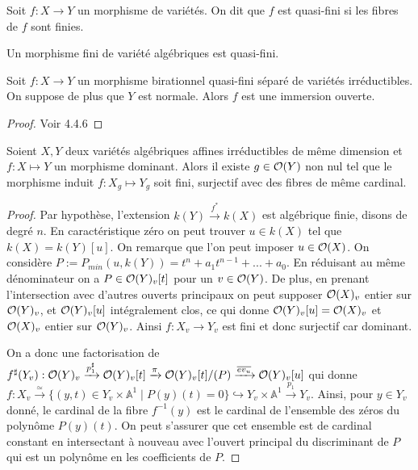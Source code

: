 \begin{defn}
Soit $f:X \rightarrow Y$ un morphisme de variétés. On dit que $f$ est quasi-fini si les fibres de $f$ sont finies.
\end{defn}

\begin{ex}
Un morphisme fini de variété algébriques est quasi-fini.
\end{ex}

\begin{thm}\label{ZMT}
Soit $f:X\rightarrow Y$ un morphisme birationnel quasi-fini séparé de variétés irréductibles. On suppose de plus que $Y$ est normale. Alors $f$ est une immersion ouverte.
\end{thm}
\begin{proof}
Voir \cite{QingLiu} 4.4.6
\end{proof}

\begin{prop}\label{fibersCardinal}
Soient $X,Y$ deux variétés algébriques affines irréductibles de même dimension et $f:X \mapsto Y$ un morphisme dominant. Alors il existe $g\in \mathcal{O}(Y)$ non nul tel que le morphisme induit $f:X_g \mapsto Y_g$ soit fini, surjectif avec des fibres de même cardinal.
\end{prop}
\begin{proof}
Par hypothèse, l'extension $k(Y) \xrightarrow{f^*} k(X)$ est algébrique finie, disons de degré $n$. En caractéristique zéro on peut trouver $u\in k(X)$ tel que $k(X)=k(Y)[u]$. On remarque que l'on peut imposer $u\in \mathcal{O}(X)$. On considère $P:=P_{min}(u, k(Y))=t^n+a_1t^{n-1}+...+a_0$. En réduisant au même dénominateur on a $P\in \mathcal{O}(Y)_v[t]$ pour un $v\in \mathcal{O}(Y)$. De plus, en prenant l'intersection avec d'autres ouverts principaux on peut supposer $\mathcal{O}(X)_v$ entier sur $\mathcal{O}(Y)_v$, et $\mathcal{O}(Y)_v[u]$ intégralement clos, ce qui donne $\mathcal{O}(Y)_v[u]=\mathcal{O}(X)_v$ et $\mathcal{O}(X)_v$ entier sur $\mathcal{O}(Y)_v$. Ainsi $f:X_v \rightarrow Y_v$ est fini et donc surjectif car dominant.

On a donc une factorisation de $f^\sharp(Y_v):\mathcal{O}(Y)_v\xrightarrow{p_1^\sharp}\mathcal{O}(Y)_v[t]\xrightarrow{\pi}\mathcal{O}(Y)_v[t]/(P)\xrightarrow{\overline{ev_u}}\mathcal{O}(Y)_v[u]$ qui donne $f:X_v \xrightarrow{\simeq} \lbrace (y,t) \in Y_v\times \mathbb{A}^1\mid P(y)(t)=0\rbrace \hookrightarrow Y_v\times \mathbb{A}^1 \xrightarrow{p_1} Y_v$. Ainsi, pour $y\in Y_v$ donné, le cardinal de la fibre $f^{-1}(y)$ est le cardinal de l'ensemble des zéros du polynôme $P(y)(t)$. On peut s'assurer que cet ensemble est de cardinal constant en intersectant à nouveau avec l'ouvert principal du discriminant de $P$ qui est un polynôme en les coefficients de $P$.
\end{proof}

